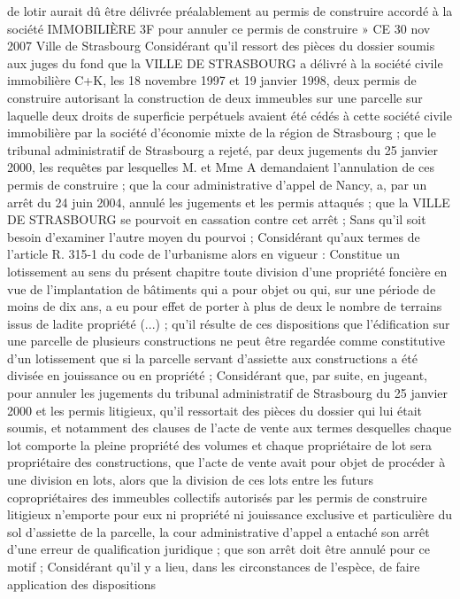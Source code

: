 \documentclass[11pt,a4paper]{report}
\begin{document}
	de lotir aurait dû être délivrée préalablement au permis de construire accordé à la société IMMOBILIÈRE 3F
	pour annuler ce permis de construire »
	CE 30 nov 2007  Ville de Strasbourg
	Considérant qu'il ressort des pièces du dossier soumis aux juges du fond que la VILLE DE STRASBOURG a
	délivré à la société civile immobilière C+K, les 18 novembre 1997 et 19 janvier 1998, deux permis de construire
	autorisant la construction de deux immeubles sur une parcelle sur laquelle deux droits de superficie perpétuels
	avaient été cédés à cette société civile immobilière par la société d'économie mixte de la région de Strasbourg ;
	que le tribunal administratif de Strasbourg a rejeté, par deux jugements du 25 janvier 2000, les requêtes par
	lesquelles M. et Mme A demandaient l'annulation de ces permis de construire ; que la cour administrative d'appel
	de Nancy, a, par un arrêt du 24 juin 2004, annulé les jugements et les permis attaqués ; que la VILLE DE
	STRASBOURG se pourvoit en cassation contre cet arrêt ; Sans qu'il soit besoin d'examiner l'autre moyen du
	pourvoi ; Considérant qu'aux termes de l'article R. 315-1 du code de l'urbanisme alors en vigueur : Constitue un
	lotissement au sens du présent chapitre toute division d'une propriété foncière en vue de l'implantation de
	bâtiments qui a pour objet ou qui, sur une période de moins de dix ans, a eu pour effet de porter à plus de deux le
	nombre de terrains issus de ladite propriété (...) ; qu'il résulte de ces dispositions que l'édification sur une parcelle
	de plusieurs constructions ne peut être regardée comme constitutive d'un lotissement que si la parcelle servant
	d'assiette aux constructions a été divisée en jouissance ou en propriété ; Considérant que, par suite, en jugeant,
	pour annuler les jugements du tribunal administratif de Strasbourg du 25 janvier 2000 et les permis litigieux, qu'il
	ressortait des pièces du dossier qui lui était soumis, et notamment des clauses de l'acte de vente aux termes
	desquelles chaque lot comporte la pleine propriété des volumes et chaque propriétaire de lot sera propriétaire des
	constructions, que l'acte de vente avait pour objet de procéder à une division en lots, alors que la division de ces
	lots entre les futurs copropriétaires des immeubles collectifs autorisés par les permis de construire litigieux
	n'emporte pour eux ni propriété ni jouissance exclusive et particulière du sol d'assiette de la parcelle, la cour
	administrative d'appel a entaché son arrêt d'une erreur de qualification juridique ; que son arrêt doit être annulé
	pour ce motif ; Considérant qu'il y a lieu, dans les circonstances de l'espèce, de faire application des dispositions
\end{document}
